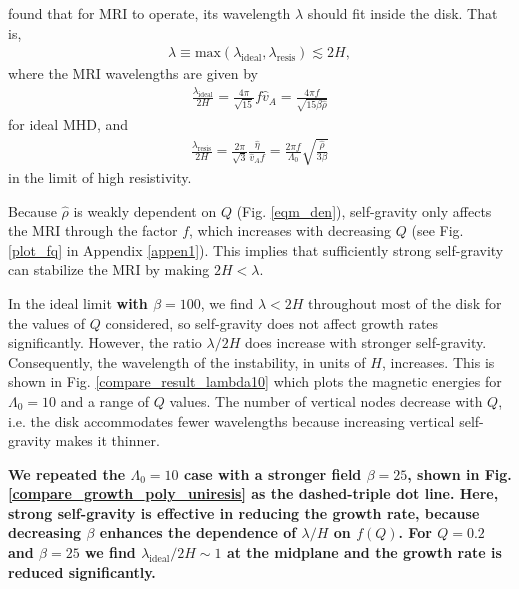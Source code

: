\cite{sano99} found that for MRI to operate, its 
wavelength $\lambda$ should fit inside the disk. That is,   
\begin{align}\label{sano_crit}
  \lambda \equiv
  \mathrm{max}\left(\lambda_\mathrm{ideal},\lambda_\mathrm{resis}\right)\lesssim
  2H, 
\end{align}
where the MRI wavelengths are given by 
\begin{align}\label{lambda_ideal}
  \frac{\lambda_\mathrm{ideal}}{2H} = \frac{4\pi}{\sqrt{15}} f \hat{v}_A =
  \frac{4\pi f}{\sqrt{15\beta\hat{\rho}}}
\end{align}
for ideal MHD, and 
\begin{align}\label{lambda_resis}
  \frac{\lambda_\mathrm{resis}}{2H} = \frac{2\pi}{\sqrt{3}}\frac{\hat{\eta}}{\hat{v}_A f} =
  \frac{2\pi f}{\Lambda_0}\sqrt{\frac{\hat{\rho}}{3\beta}} 
\end{align}
in the limit of high resistivity.  
   
Because $\hat{\rho}$ is weakly dependent
on $Q$ (Fig. \ref{eqm_den}), self-gravity only affects the
MRI through the factor $f$, which increases with decreasing $Q$ (see
Fig. \ref{plot_fq} in Appendix \ref{appen1}).   
This implies that sufficiently strong self-gravity can stabilize the
MRI by making $ 2H<\lambda $.   
 
In the ideal limit {\bf with $\beta=100$}, we find $\lambda < 2H$
throughout most of the disk for the values of $Q$ considered, so
self-gravity does not affect growth rates significantly. However, the
ratio $\lambda/2H$ does increase with stronger
self-gravity. Consequently, the wavelength of the instability, in
units of $H$, increases. This is shown in
Fig. \ref{compare_result_lambda10} which plots the magnetic energies
for $\Lambda_0=10$ and a range of $Q$ values. The number of vertical 
nodes decrease with $Q$, i.e. the disk accommodates fewer wavelengths
because increasing vertical self-gravity makes it thinner. 

{\bf
We repeated the $\Lambda_0=10$ case with a stronger field $\beta=25$,
shown in Fig. \ref{compare_growth_poly_uniresis} as the dashed-triple
dot line. Here, strong self-gravity is effective in reducing the
growth rate, because decreasing $\beta$ enhances the dependence of
$\lambda/H$ on $f(Q)$. For $Q=0.2$ and $\beta=25$ we find 
$\lambda_\mathrm{ideal}/2H\sim 1$ at the midplane and the growth rate is reduced significantly.   
} 

